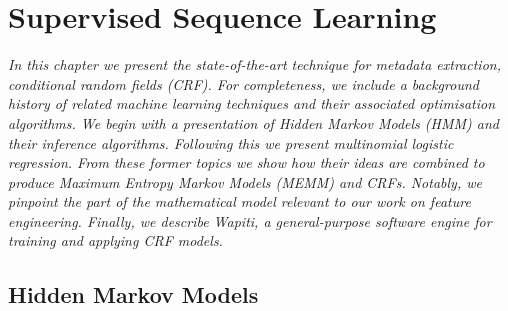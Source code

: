 
\chapter{Supervised Sequence Learning} %

\label{Chapter2} %



\emph{In this chapter we present the state-of-the-art technique for metadata extraction, conditional random fields (CRF). For completeness, we include a background history of related machine learning techniques and their associated optimisation algorithms. We begin with a presentation of Hidden Markov Models (HMM) and their inference algorithms. Following this we present multinomial logistic regression. From these former topics we show how their ideas are combined to produce Maximum Entropy Markov Models (MEMM) and CRFs. Notably, we pinpoint the part of the mathematical model relevant to our work on feature engineering. Finally, we describe Wapiti, a general-purpose software engine for training and applying CRF models.}

\section{Hidden Markov Models}

